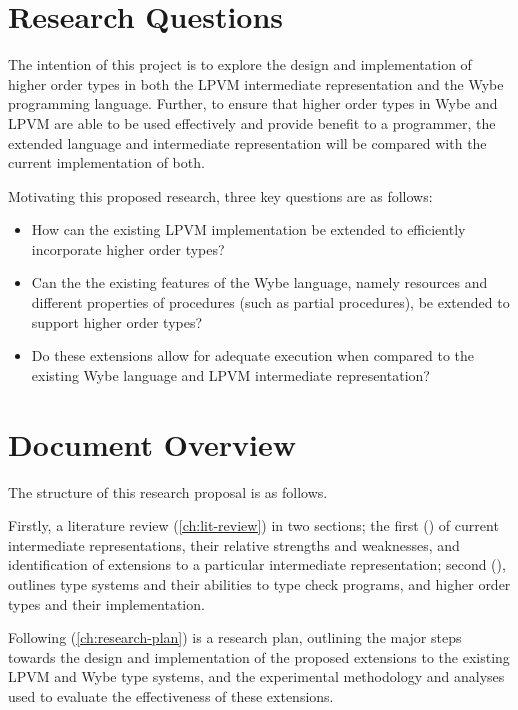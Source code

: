 \section{Research Questions}

The intention of this project is to explore the design and implementation of higher order types in both the LPVM intermediate representation and the Wybe programming language. Further, to ensure that higher order types in Wybe and LPVM are able to be used effectively and provide benefit to a programmer, the extended language and intermediate representation will be compared with the current implementation of both.

Motivating this proposed research, three key questions are as follows:
\begin{itemize}
  \item How can the existing LPVM implementation be extended to efficiently incorporate higher order types?
  \item Can the the existing features of the Wybe language, namely resources and different properties of procedures (such as partial procedures), be extended to support higher order types?
  \item Do these extensions allow for adequate execution when compared to the existing Wybe language and LPVM intermediate representation?
\end{itemize}

\section{Document Overview}

The structure of this research proposal is as follows. 

Firstly, a literature review (\cref{ch:lit-review}) in two sections; the first () of current intermediate representations, their relative strengths and weaknesses, and identification of extensions to a particular intermediate representation; second (), outlines type systems and their abilities to type check programs, and higher order types and their implementation.

Following (\cref{ch:research-plan}) is a research plan, outlining the major steps towards the design and implementation of the proposed extensions to the existing LPVM and Wybe type systems, and the experimental methodology and analyses used to evaluate the effectiveness of these extensions.

